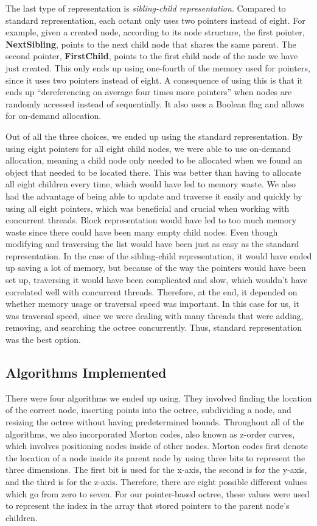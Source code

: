 \documentclass[conference]{IEEEtran}
\begin{document}
The last type of representation is \textit{sibling-child representation}. Compared to standard representation, each octant only uses two pointers instead of eight. For example, given a created node, according to its node structure, the first pointer, \textbf{NextSibling}, points to the next child node that shares the same parent. The second pointer, \textbf{FirstChild}, points to the first child node of the node we have just created. This only ends up using one-fourth of the memory used for pointers, since it uses two pointers instead of eight. A consequence of using this is that it ends up “dereferencing on average four times more pointers” \cite{octrees2} when nodes are randomly accessed instead of sequentially. It also uses a Boolean flag and allows for on-demand allocation\cite{octrees2}.

Out of all the three choices, we ended up using the standard representation. By using eight pointers for all eight child nodes, we were able to use on-demand allocation, meaning a child node only needed to be allocated when we found an object that needed to be located there. This was better than having to allocate all eight children every time, which would have led to memory waste.  We also had the advantage of being able to update and traverse it easily and quickly by using all eight pointers, which was beneficial and crucial when working with concurrent threads. Block representation would have led to too much memory waste since there could have been many empty child nodes. Even though modifying and traversing the list would have been just as easy as the standard representation. In the case of the sibling-child representation, it would have ended up saving a lot of memory, but because of the way the pointers would have been set up, traversing it would have been complicated and slow, which wouldn't have correlated well with concurrent threads. Therefore, at the end, it depended on whether memory usage or traversal speed was important. In this case for us, it was traversal speed, since we were dealing with many threads that were adding, removing, and searching the octree concurrently. Thus, standard representation was the best option.

\subsection{Algorithms Implemented}

There were four algorithms we ended up using. They involved finding the location of the correct node, inserting points into the octree, subdividing a node, and resizing the octree without having predetermined bounds. Throughout all of the algorithms, we also incorporated Morton codes, also known as z-order curves, which involves positioning nodes inside of other nodes. Morton codes first denote the location of a node inside its parent node by using three bits to represent the three dimensions. The first bit is used for the x-axis, the second is for the y-axis, and the third is for the z-axis. Therefore, there are eight possible different values which go from zero to seven. For our pointer-based octree, these values were used to represent the index in the array that stored pointers to the parent node’s children.
\end{document}
